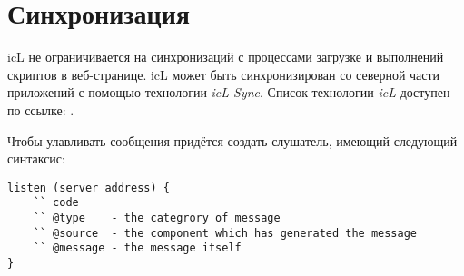 \section{Синхронизация}

icL не ограничивается на синхронизаций с процессами загрузке и выполнений скриптов в веб-странице. icL может быть синхронизирован со северной части приложений с помощью технологии \textit{icL-Sync}. Список технологии \textit{icL} доступен по ссылке: .

Чтобы улавливать сообщения придётся создать слушатель, имеющий следующий синтаксис:
\begin{lstlisting}
listen (server address) {
	`` code
	`` @type	- the categrory of message
	`` @source	- the component which has generated the message
	`` @message	- the message itself
}
\end{lstlisting}


